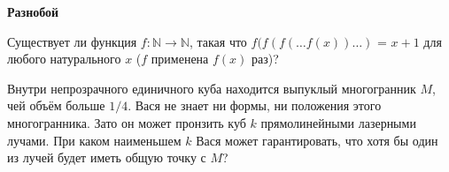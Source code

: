 \documentclass{article}
\begin{document}
    \large

    \begin{center}
        \textbf{Разнобой}
    \end{center}

    \begin{enumerate_boxed}

        \item Существует ли функция $f: \mathbb{N} \rightarrow \mathbb{N} $, такая что $f(f(f(\dotsc f(x))\dotsc)$ = $x + 1$ для любого натурального $x$ ($f$ применена $f(x)$ раз)?

        \item Внутри непрозрачного единичного куба находится выпуклый многогранник $M$, чей объём больше $1/4$.
        Вася не знает ни формы, ни положения этого многогранника.
        Зато он может пронзить куб $k$ прямолинейными лазерными лучами.
        При каком наименьшем $k$ Вася может гарантировать, что хотя бы один из лучей будет иметь общую точку с $M$?

    \end{enumerate_boxed}
\end{document}
